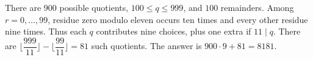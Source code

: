 There are $900$ possible quotients, $100\le q\le999$, and $100$ remainders. Among $r=0,\ldots,99$, residue zero modulo eleven occurs ten times and every other residue nine times. Thus each $q$ contributes nine choices, plus one extra if $11\mid q$. There are $\lfloor\dfrac{999}{11}\rfloor-\lfloor\dfrac{99}{11}\rfloor=81$ such quotients. The answer is $900\cdot9+81=\boxed{8181}$.
